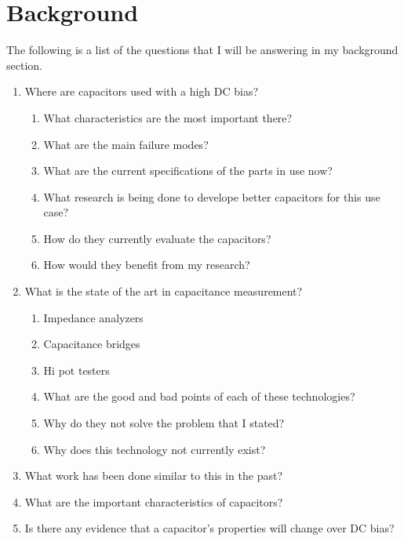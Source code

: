 \section {Background}

The following is a list of the questions that I will be answering in my background section.

\begin {enumerate}
    \item Where are capacitors used with a high DC bias?
    \begin {enumerate}
        \item What characteristics are the most important there?
        \item What are the main failure modes?
        \item What are the current specifications of the parts in use now?
        \item What research is being done to develope better capacitors for this use case?
        \item How do they currently evaluate the capacitors?
        \item How would they benefit from my research?
    \end {enumerate}
    \item What is the state of the art in capacitance measurement?
    \begin {enumerate}
        \item Impedance analyzers
        \item Capacitance bridges
        \item Hi pot testers
        \item What are the good and bad points of each of these technologies?
        \item Why do they not solve the problem that I stated? 
        \item Why does this technology not currently exist?
    \end {enumerate}
    \item What work has been done similar to this in the past?
    \item What are the important characteristics of capacitors?
    \item Is there any evidence that a capacitor's properties will change over DC bias?
\end {enumerate}


